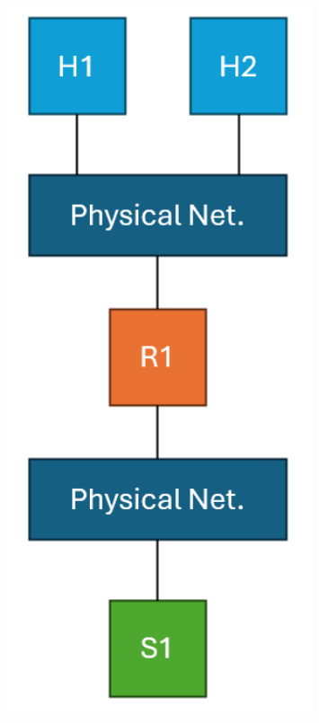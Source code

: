 \documentclass[compress]{beamer}
\begin{document}
\begin{frame}
\begin{columns}
            \begin{column}{0.3\textwidth}
                \begin{figure}
                    \centering
                    \includegraphics[width=0.8\textwidth]{../img/example-net}
                \end{figure}
            \end{column}
        \end{columns}
    \end{frame}
\end{document}
